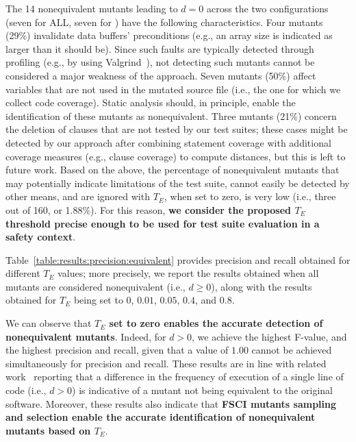 The 14 nonequivalent mutants leading to $d=0$ across the two configurations (seven for ALL, seven for \APPR) have the following characteristics.
Four mutants (29\%) invalidate data buffers' preconditions (e.g., an array size is indicated as larger than it should be). Since such faults are typically detected through profiling (e.g., by using Valgrind~\cite{Valgrind}), not detecting such mutants cannot be considered a major weakness of the approach. Seven mutants (50\%) affect variables that are not used in the mutated source file (i.e., the one for which we collect code coverage). 
Static analysis should, in principle, enable the identification of these mutants as nonequivalent. 
Three mutants (21\%) concern the deletion of clauses that are not tested by our test suites; these cases might be detected by our approach after combining statement coverage with additional coverage measures (e.g., clause coverage) to compute distances, but this is left to future work. Based on the above, the percentage of nonequivalent mutants that
may potentially indicate limitations of the test suite, cannot easily be detected by other means, 
and are ignored with $T_E$, when set to zero, is very low 
 (i.e., three out of 160, or 1.88\%). For this reason, \textbf{we consider the proposed $T_E$ threshold precise enough to be used for test suite evaluation in a safety context}.
 
Table~\ref{table:results:precision:equivalent} provides precision and recall obtained for different $T_E$ values; more precisely, we report the results obtained when all mutants are considered nonequivalent (i.e., $d\ge0$), along with the results obtained for $T_E$ being set to $0$, $0.01$, $0.05$, $0.4$, and $0.8$. 



 We can observe that \textbf{$T_E$ set to zero enables the accurate detection of nonequivalent mutants}. Indeed, 
for $d>0$, we achieve the highest F-value, and the highest precision and recall, given that a value of $1.00$ cannot be achieved simultaneously for precision and recall.
These results are in line with related work~\cite{zhang2013faster} reporting that a difference in the frequency of execution of a single line of code (i.e., $d>0$) is indicative of a mutant not being equivalent to the original software.
Moreover, these results also indicate that \textbf{FSCI mutants sampling and \MPTS selection enable the accurate identification of nonequivalent mutants based on $T_E$}.




